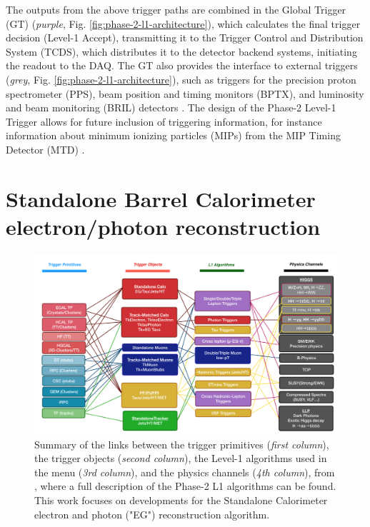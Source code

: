 The outputs from the above trigger paths are combined in the Global Trigger (GT) (\textit{purple}, Fig. \ref{fig:phase-2-l1-architecture}), which calculates the final trigger decision (Level-1 Accept), transmitting it to the Trigger Control and Distribution System (TCDS), which distributes it to the detector backend systems, initiating the readout to the DAQ. The GT also provides the interface to external triggers (\textit{grey}, Fig. \ref{fig:phase-2-l1-architecture}), such as triggers for the precision proton spectrometer (PPS), beam position and timing monitors (BPTX), and luminosity and beam monitoring (BRIL) detectors \cite{CMS-TDR-021}. The design of the Phase-2 Level-1 Trigger allows for future inclusion of triggering information, for instance information about minimum ionizing particles (MIPs) from the MIP Timing Detector (MTD) \cite{CERN-LHCC-2017-027}.

\section{Standalone Barrel Calorimeter electron/photon reconstruction}
\begin{figure}[ht]
    \centering
    \includegraphics[width=15cm]{figures/ch-3-phase2/phase-2-summary-trigger-TP-algo-physics.png}
    \caption[Summary of the links between the trigger primitives, the trigger objects, the Level-1 algorithms, and the physics channels in the Phase-2 menu.]{Summary of the links between the trigger primitives (\textit{first column}), the trigger objects (\textit{second column}), the Level-1 algorithms used in the menu (\textit{3rd column}), and the physics channels (\textit{4th column}), from \cite{CMS-TDR-021}, where a full description of the Phase-2 L1 algorithms can be found. This work focuses on developments for the Standalone Calorimeter electron and photon ("EG") reconstruction algorithm.}
    \label{fig:phase-2-summary-trigger-TP-algo-physics}
\end{figure}


